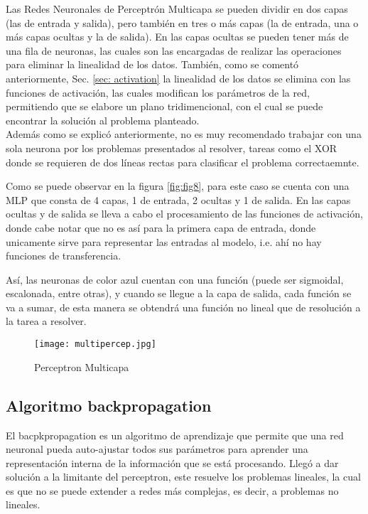         Las Redes Neuronales de Perceptr\'on Multicapa se pueden dividir en dos capas (las de entrada y salida), pero también en tres o más capas (la de entrada, una o más capas ocultas y la de salida).  En las capas ocultas se pueden tener m\'as de una fila de neuronas, las cuales son las encargadas de realizar las operaciones para eliminar la linealidad de los datos.  También, como se comentó anteriormente,  Sec. \eqref{sec: activation} la linealidad de los datos se elimina con las funciones de activaci\'on,  las cuales modifican los parámetros de la red,  permitiendo que se elabore un plano tridimencional, con el cual se puede encontrar la soluci\'on al problema planteado.\\
        Adem\'as como se explicó anteriormente, no es muy recomendado trabajar con una sola neurona por los problemas presentados al resolver, tareas como el XOR donde se requieren de dos líneas rectas para clasificar el problema correctaemnte.

        Como se puede observar en la figura \eqref{fig:fig8}, para este caso se cuenta con una MLP que consta de 4 capas,  1 de entrada, 2 ocultas y 1 de salida. En las capas ocultas y de salida se lleva a cabo el procesamiento de las funciones de activación, donde cabe notar que no es así para la primera capa de entrada, donde unicamente sirve para representar las entradas al modelo, i.e. ahí no hay funciones de transferencia. 

        Así, las neuronas de color azul cuentan con una funci\'on (puede ser sigmoidal, escalonada, entre otras), y cuando se llegue a la capa de salida, cada funci\'on se va a sumar, de esta manera se obtendrá una funci\'on no lineal que de resoluci\'on a la tarea a resolver.
        \begin{figure}[H]
          \centering
          \texttt{[image: multipercep.jpg]}
          \caption{Perceptron Multicapa}
          \label{fig:fig8}
        \end{figure}

    \subsection{Algoritmo backpropagation}
        
      El bacpkpropagation es un algoritmo de aprendizaje que permite que una red neuronal pueda auto-ajustar todos sus parámetros para aprender una representaci\'on interna de la informaci\'on que se está procesando. Lleg\'o a dar solución a la limitante del perceptron, este resuelve los problemas lineales, la cual es que no se puede extender a redes más complejas, es decir, a problemas no lineales. \\

